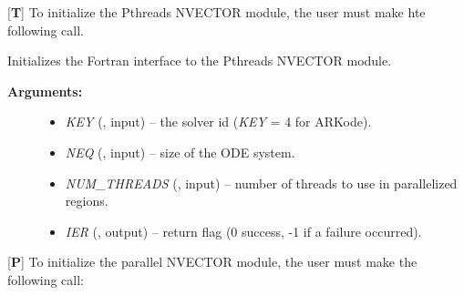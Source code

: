 \documentclass[letterpaper,10pt,english]{sphinxmanual}
\begin{document}
{[}\textbf{T}{]} To initialize the Pthreads NVECTOR module, the user must
make hte following call.

\begin{fulllineitems}
\label{f_interface/Usage:f/_/FNVINITPTS}
Initializes the Fortran interface to the Pthreads NVECTOR module.
\begin{description}
\item[{\textbf{Arguments:}}] \leavevmode\begin{itemize}
\item {} 
\emph{KEY} (, input) -- the solver id (\emph{KEY} = 4 for ARKode).

\item {} 
\emph{NEQ} (, input) -- size of the ODE system.

\item {} 
\emph{NUM\_THREADS} (, input) -- number of threads to use in
parallelized regions.

\item {} 
\emph{IER} (, output) -- return flag (0 success, -1 if a
failure occurred).

\end{itemize}

\end{description}

\end{fulllineitems}


{[}\textbf{P}{]} To initialize the parallel NVECTOR module, the user must
make the following call:
\end{document}
